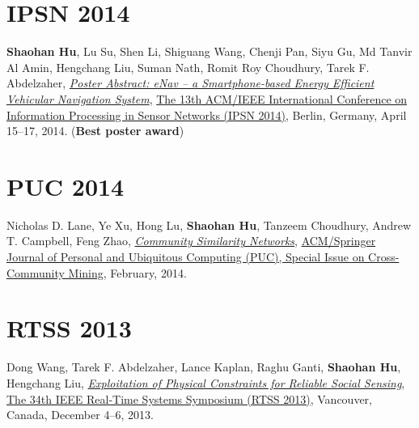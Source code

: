 
\section{\sc IPSN 2014}\hypertarget{hu2014ipsn}{}
\textbf{Shaohan Hu}, Lu Su, Shen Li, Shiguang Wang, Chenji Pan, Siyu Gu, Md Tanvir Al Amin, Hengchang Liu, Suman Nath, Romit Roy Choudhury, Tarek F. Abdelzaher,
\href{http://dl.acm.org/citation.cfm?id=2602374}{\emph{Poster Abstract: eNav -- a Smartphone-based Energy Efficient Vehicular Navigation System}},
\href{http://ipsn.acm.org/2014/}{\textsf{The 13th ACM/IEEE International Conference on Information Processing in Sensor Networks (IPSN 2014)}},
Berlin, Germany, April 15--17, 2014. (\textbf{Best poster award})

\section{\sc PUC 2014}\hypertarget{lane2013puc}{}
Nicholas D. Lane, Ye Xu, Hong Lu, \textbf{Shaohan Hu}, Tanzeem Choudhury, Andrew T. Campbell, Feng Zhao,
\href{http://link.springer.com/article/10.1007/s00779-013-0655-1}{\emph{Community Similarity Networks}},
\href{http://www.springer.com/computer/hci/journal/779}{\textsf{ACM/Springer Journal of Personal and Ubiquitous Computing (PUC), Special Issue on Cross-Community Mining}},
February, 2014.

\section{\sc RTSS 2013}\hypertarget{wang2013rtss}{}
Dong Wang, Tarek F. Abdelzaher, Lance Kaplan, Raghu Ganti, \textbf{Shaohan Hu}, Hengchang Liu,
\href{http://ieeexplore.ieee.org/xpl/articleDetails.jsp?arnumber=6728876}{\emph{Exploitation of Physical Constraints for Reliable Social Sensing}},
\href{http://2013.ieee-rtss.org/}{\textsf{The 34th IEEE Real-Time Systems Symposium (RTSS 2013)}},
Vancouver, Canada, December 4--6, 2013.

